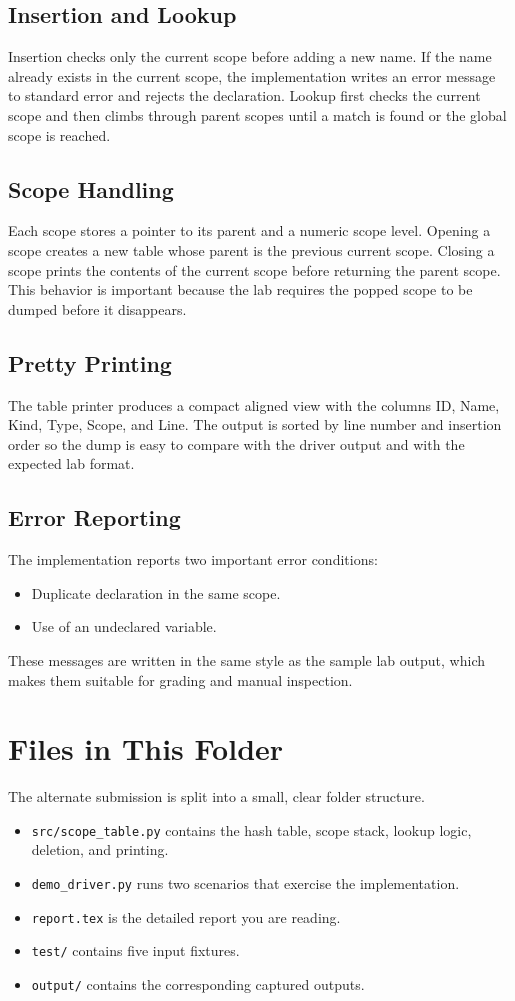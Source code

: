\documentclass[11pt]{article}
\begin{document}
\subsection{Insertion and Lookup}
Insertion checks only the current scope before adding a new name. If the name already exists in the current scope, the implementation writes an error message to standard error and rejects the declaration. Lookup first checks the current scope and then climbs through parent scopes until a match is found or the global scope is reached.

\subsection{Scope Handling}
Each scope stores a pointer to its parent and a numeric scope level. Opening a scope creates a new table whose parent is the previous current scope. Closing a scope prints the contents of the current scope before returning the parent scope. This behavior is important because the lab requires the popped scope to be dumped before it disappears.

\subsection{Pretty Printing}
The table printer produces a compact aligned view with the columns ID, Name, Kind, Type, Scope, and Line. The output is sorted by line number and insertion order so the dump is easy to compare with the driver output and with the expected lab format.

\subsection{Error Reporting}
The implementation reports two important error conditions:
\begin{itemize}[leftmargin=1.25em]
  \item Duplicate declaration in the same scope.
  \item Use of an undeclared variable.
\end{itemize}
These messages are written in the same style as the sample lab output, which makes them suitable for grading and manual inspection.

\section{Files in This Folder}
The alternate submission is split into a small, clear folder structure.
\begin{itemize}[leftmargin=1.25em]
  \item \texttt{src/scope\_table.py} contains the hash table, scope stack, lookup logic, deletion, and printing.
  \item \texttt{demo\_driver.py} runs two scenarios that exercise the implementation.
  \item \texttt{report.tex} is the detailed report you are reading.
  \item \texttt{test/} contains five input fixtures.
  \item \texttt{output/} contains the corresponding captured outputs.
\end{itemize}
\end{document}

